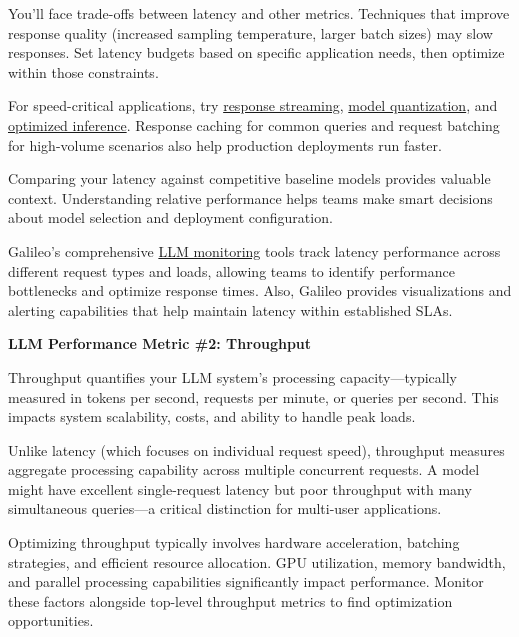 \documentclass[
  letterpaper,
  DIV=11,
  numbers=noendperiod,
  oneside]{scrreprt}
\begin{document}
\begin{tcolorbox}
You'll face trade-offs between latency and other metrics. Techniques
that improve response quality (increased sampling temperature, larger
batch sizes) may slow responses. Set latency budgets based on specific
application needs, then optimize within those constraints.

For speed-critical applications, try
\href{https://gautam75.medium.com/streaming-llm-responses-importance-and-implementation-911b135ef541}{response
streaming},
\href{https://medium.com/@sulbha.jindal/introduction-to-llm-quantization-d274020e6ab5}{model
quantization}, and
\href{https://medium.com/@manindersingh120996/how-to-optimize-llm-inference-0076d9f3dd1b}{optimized
inference}. Response caching for common queries and request batching for
high-volume scenarios also help production deployments run faster.

Comparing your latency against competitive baseline models provides
valuable context. Understanding relative performance helps teams make
smart decisions about model selection and deployment configuration.

Galileo's comprehensive
\href{https://www.galileo.ai/blog/the-definitive-guide-to-llm-monitoring-for-ai-professionals}{LLM
monitoring} tools track latency performance across different request
types and loads, allowing teams to identify performance bottlenecks and
optimize response times. Also, Galileo provides visualizations and
alerting capabilities that help maintain latency within established
SLAs.

\textbf{LLM Performance Metric \#2: Throughput}

Throughput quantifies your LLM system's processing capacity---typically
measured in tokens per second, requests per minute, or queries per
second. This impacts system scalability, costs, and ability to handle
peak loads.

Unlike latency (which focuses on individual request speed), throughput
measures aggregate processing capability across multiple concurrent
requests. A model might have excellent single-request latency but poor
throughput with many simultaneous queries---a critical distinction for
multi-user applications.

Optimizing throughput typically involves hardware acceleration, batching
strategies, and efficient resource allocation. GPU utilization, memory
bandwidth, and parallel processing capabilities significantly impact
performance. Monitor these factors alongside top-level throughput
metrics to find optimization opportunities.


\end{tcolorbox}
\end{document}
